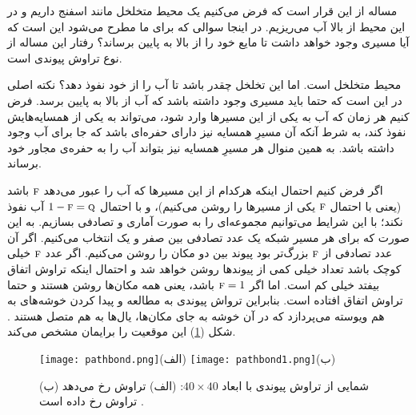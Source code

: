 مساله از این قرار است که فرض می‌کنیم یک محیط متخلخل مانند اسفنج داریم و در این محیط از بالا آب می‌ریزیم. در اینجا سوالی  که برای ما مطرح می‌شود  این است که آیا مسیری وجود خواهد داشت تا مایع خود را از بالا به پایین برساند؟ رفتار این مساله از نوع تراوش پیوندی است. 

محیط متخلخل است. اما این تخلخل چقدر باشد تا آب را از خود نفوذ دهد؟ نکته اصلی در این است که حتما باید مسیری وجود داشته باشد که آب از بالا به پایین برسد.  فرض کنیم هر زمان  که آب به یکی از این مسیر‌ها وارد شود، می‌تواند به یکی از همسایه‌هایش نفوذ کند، به شرط آنکه آن مسیر‌ِ همسایه نیز دارای حفره‌ای باشد که جا برای آب وجود داشته باشد. به همین منوال هر مسیرِ 
همسایه نیز بتواند آب را به حفره‌ی مجاور خود برساند. 

اگر فرض کنیم احتمال اینکه هرکدام از این مسیرها که آب را عبور می‌دهد $\textsc{f}$ باشد (یعنی با احتمال $\textsc{f}$ یکی از مسیرها را روشن می‌کنیم)، و با احتمال
 $1 - \textsc{f} = \textsc{q}$ 
 آب نفوذ نکند؛ با این شرایط می‌توانیم مجموعه‌ای را به صورت آماری و تصادفی بسازیم. به این صورت که  برای هر مسیر شبکه یک عدد تصادفی بین صفر و یک انتخاب می‌کنیم. اگر آن عدد تصادفی از $\textsc{f}$ بزرگ‌تر بود پیوند  بین دو مکان را روشن می‌کنیم. اگر عدد $\textsc{f}$ خیلی کوچک باشد تعداد خیلی کمی از پیوندها روشن خواهد شد و احتمال اینکه تراوش اتفاق بیفتد خیلی کم است.  اما اگر 
 $\textsc{f} = 1$
  باشد، یعنی همه مکان‌ها روشن هستند و حتما تراوش اتفاق افتاده است. بنابراین ترواش پیوندی به مطالعه و پیدا کردن خوشه‌های به هم ویوسته   می‌پردازد که در آن خوشه به جای مکان‌ها، یال‌ها به هم متصل هستند \cite{book}.
 شکل (\ref{fig:bond})  این موقعیت را برایمان مشخص می‌کند.
\begin{figure}[htbp]
\hspace*{0cm}
\centering
\texttt{[image: pathbond.png]}\centering(الف)    
\texttt{[image: pathbond1.png]}\centering(ب)
\caption[شمایی از تراوش پیوندی] {\footnotesize شمایی از تراوش پیوندی با ابعاد $40\times 40$: (الف) تراوش رخ می‌دهد  (ب) تراوش رخ داده است \cite{bela}.}
\label{fig:bond}
\end{figure}\\
\ 

 

 


